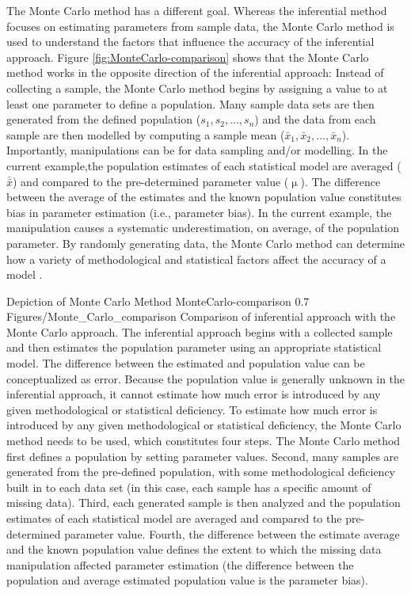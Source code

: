 \documentclass[
12pt, %
twoside,
english]{guelphthesis}
\begin{document}
The Monte Carlo method has a different goal. Whereas the inferential method focuses on estimating parameters from sample data, the Monte Carlo method is used to understand the factors that influence the accuracy of the inferential approach. Figure \ref{fig:MonteCarlo-comparison} shows that the Monte Carlo method works in the opposite direction of the inferential approach: Instead of collecting a sample, the Monte Carlo method begins by assigning a value to at least one parameter to define a population. Many sample data sets are then generated from the defined population (\(s_1, s_2, ..., s_n\)) and the data from each sample are then modelled by computing a sample mean (\(\bar{x}_1, \bar{x}_2, ..., \bar{x}_n\)). Importantly, manipulations can be for data sampling and/or modelling. In the current example,the population estimates of each statistical model are averaged (\(\bar{\bar{x}}\)) and compared to the pre-determined parameter value (\(\upmu\)). The difference between the average of the estimates and the known population value constitutes bias in parameter estimation (i.e., parameter bias). In the current example, the manipulation causes a systematic underestimation, on average, of the population parameter. By randomly generating data, the Monte Carlo method can determine how a variety of methodological and statistical factors affect the accuracy of a model \autocite[for a review, see][]{robert2010}.
\begin{apaFigure}
[landscape]
[samepage]
[0cm]
{Depiction of Monte Carlo Method}
{MonteCarlo-comparison}
{0.7}
{Figures/Monte_Carlo_comparison}
{Comparison of inferential approach with the Monte Carlo approach. The inferential approach begins with a collected sample and then estimates the population parameter using an appropriate statistical model. The difference between the estimated and population value can be conceptualized as error. Because the population value is generally unknown in the inferential approach, it cannot estimate how much error is introduced by any given methodological or statistical deficiency. To estimate how much error is introduced by any given methodological or statistical deficiency, the Monte Carlo method needs to be used, which constitutes four steps. The Monte Carlo method first defines a population by setting parameter values. Second, many samples are generated from the pre-defined population, with some methodological deficiency built in to each data set (in this case, each sample has a specific amount of missing data). Third, each generated sample is then analyzed and the population estimates of each statistical model are averaged and compared to the pre-determined parameter value. Fourth, the difference between the estimate average and the known population value defines the extent to which the missing data manipulation affected parameter estimation (the difference between the population and average estimated population value is the parameter bias).}
\end{apaFigure}
\end{document}
